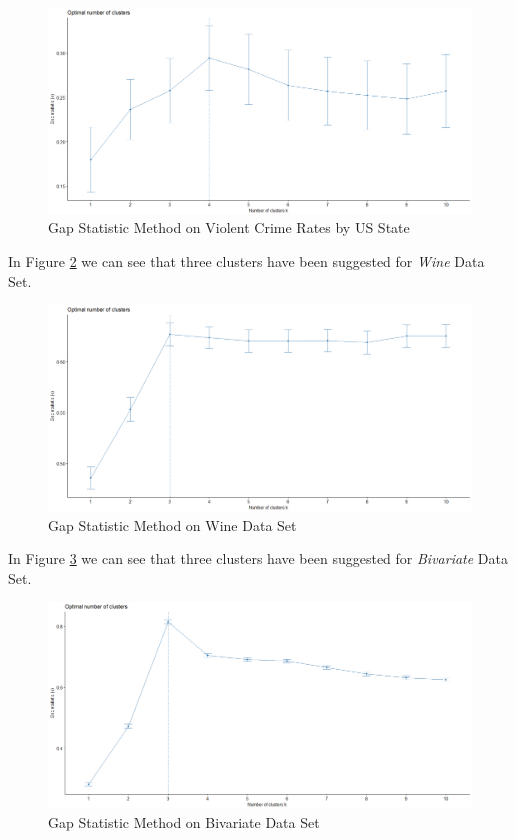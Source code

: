\begin{itemize}
\begin{figure}[h!]
  \centering
  \includegraphics[scale=1.3]{figures/results/USArrests/gap.png}
  \caption{Gap Statistic Method on Violent Crime Rates by US State}
  \label{fig:gap5}
\end{figure}

\newpage

In Figure \ref{fig:gap6} we can see that three clusters have been suggested for \textit{Wine} Data Set.

\begin{figure}[h!]
  \centering
  \includegraphics[scale=1.3]{figures/results/wine/gap.png}
  \caption{Gap Statistic Method on Wine Data Set}
  \label{fig:gap6}
\end{figure}

\vspace{15mm}

In Figure \ref{fig:gap7} we can see that three clusters have been suggested for \textit{Bivariate} Data Set.

\begin{figure}[h!]
  \centering
  \includegraphics[scale=1.3]{figures/results/xclara/gap.png}
  \caption{Gap Statistic Method on Bivariate Data Set}
  \label{fig:gap7}
\end{figure}

\end{itemize}

